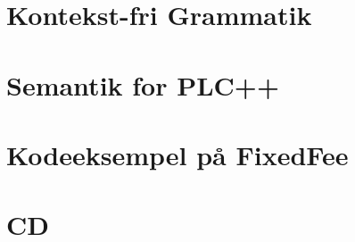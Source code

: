 \appendix

\chapter{Kontekst-fri Grammatik}
\label{bil:cfg}


\label{FIRSTAPPENDIX} %

\chapter{Semantik for PLC++}
\label{bil:semantik}


\chapter{Kodeeksempel på FixedFee}
\label{bil:fixedfee}


\chapter{CD}
\label{bil:cd}


\label{LASTAPPENDIX}



%

%


%

%